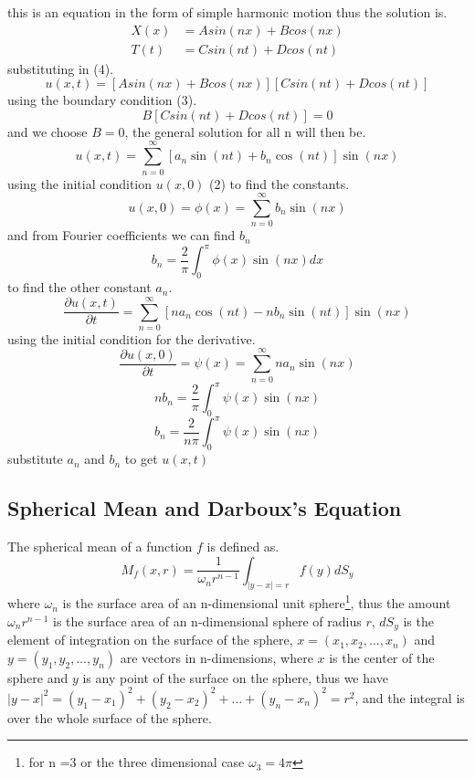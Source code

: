 \documentclass[]{article}
\begin{document}
\newpage
this is an equation in the form of simple harmonic motion thus the solution is.
\begin{align*}
X\left(x\right) &= Asin\left(nx\right)+Bcos\left(nx\right)
\\
T\left(t\right) &= Csin\left(nt\right)+Dcos\left(nt\right)
\end{align*}
substituting in (4).
\[
    u\left(x,t\right) = \left[Asin\left(nx\right)+Bcos\left(nx\right)\right]\left[Csin\left(nt\right)+Dcos\left(nt\right)\right]    
\]
using the boundary condition (3).
\[
    B\left[Csin\left(nt\right)+Dcos\left(nt\right)\right]=0    
\]
and we choose $B=0$, the general solution for all n will then be.
\[
    u\left(x,t\right) = \sum_{n=0}^{\infty}\left[a_{n}\sin\left(nt\right)+b_{n}\cos\left(nt\right)\right]\sin\left(nx\right)    
\]
using the initial condition $u(x,0)$ (2) to find the constants.
\[
    u\left(x,0\right) = \phi\left(x\right) = \sum_{n=0}^{\infty}b_{n}\sin\left(nx\right)    
\]
and from Fourier coefficients we can find $b_n$
\[
    b_n = \frac{2}{\pi}\int_{0}^{\pi}\phi\left(x\right)\sin\left(nx\right)dx    
\]
to find the other constant $a_{n}$.
\[
    \frac{\partial u\left(x,t\right)}{\partial t} = \sum_{n=0}^{\infty}\left[na_{n}\cos\left(nt\right)-nb_{n}\sin\left(nt\right)\right]\sin\left(nx\right)    
\]
using the initial condition for the derivative.
\[
    \frac{\partial u\left(x,0\right)}{\partial t} = \psi\left(x\right)= \sum_{n=0}^{\infty}na_{n}\sin\left(nx\right)    
\]
\[
    nb_n = \frac{2}{\pi} \int_{0}^{\pi}\psi\left(x\right)\sin\left(nx\right)    
\]
\[
    b_n = \frac{2}{n\pi} \int_{0}^{\pi}\psi\left(x\right)\sin\left(nx\right)    
\]
substitute $a_n$ and $b_n$ to get $u\left(x,t\right)$

\newpage 

\setcounter{equation}{0}
\subsection{Spherical Mean and Darboux's Equation}
The spherical mean of a function $f$ is defined as.
\begin{equation}
M_{f}(x,r) = \frac{1}{\omega_{n}r^{n-1}} \int_{|y-x|=r} f(y)dS_y
\end{equation}
where $\omega_{n}$ is the surface area of an n-dimensional unit sphere\footnote{for n =3 or the three dimensional case $\omega_{3} = 4\pi$}, thus the amount $\omega_{n}r^{n-1}$ is the surface area of an n-dimensional sphere of radius $r$, $dS_y$ is the element of integration on the surface of the sphere, $x = (x_{1},x_{2}, \dots,x_{n})$ and $y = (y_{1},y_{2}, \dots,y_{n})$ are vectors in n-dimensions, where $x$ is the center of the sphere and $y$ is any point of the surface on the sphere, thus we have $|y-x|^2 = {(y_{1}-x_{1})}^2 + {(y_{2}-x_{2})}^2 + \dots + {(y_{n}-x_{n})}^2 = r^2$, and the integral is over the whole surface of the sphere.
\end{document}

